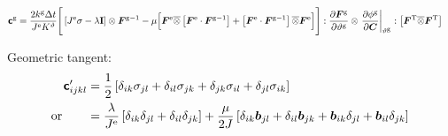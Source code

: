 \documentclass[10pt,letterpaper,oneside]{report}
\newcommand{\ten}[1]{\mbox{\boldmath $#1$}{}}
\newcommand{\tenf}[1]{\mbox{{\sffamily{\bfseries {#1}}}}}
\newcommand{\scas}[1]{\mbox{{\scriptsize{${\rm{#1}}$}}}{}}
\begin{document}
\begin{align}
\tenf{c}^{\scas{g}} ={}& \frac{2 k^{\scas{g}} \Delta t}{ J^{\scas{e}} K^\vartheta } \Bigg[ \left[ J^{\scas{e}} \sigma - \lambda \mathbf{I} \right] \otimes \ten{F}^{\scas{g}-1} - \mu \Big[ \ten{F}^{\scas{e}} \overline{\otimes} \left[ \ten{F}^{\scas{e}} \cdot \ten{F}^{\scas{g}-1} \right] + \left[ \ten{F}^{\scas{e}} \cdot \ten{F}^{\scas{g}-1} \right] \overline{\otimes} \ten{F}^{\scas{e}} \Big] \Bigg] : \frac{ \partial \ten{F}^{\scas{g}} }{ \partial \vartheta^{\scas{g}} } \otimes \left. \frac{ \partial \phi^{\scas{g}} }{ \partial \ten{C} } \right|_{\vartheta^{\scas{g}}} : \left[ \ten{F}^{\scas{T}} \overline{\otimes} \ten{F}^{\scas{T}} \right]
\notag 
\end{align}

Geometric tangent:
\begin{align}
\tenf{c}'_{ijkl} ={}& \frac{1}{2} \left[ \delta_{ik}\sigma_{jl} + \delta_{il}\sigma_{jk} + \delta_{jk}\sigma_{il} + \delta_{jl}\sigma_{ik} \right]  
\\ \mbox{or} \qquad
={}& \frac{\lambda}{J^{\scas{e}}} \left[ \delta_{ik} \delta_{jl} + \delta_{il} \delta_{jk} \right] + \frac{\mu}{2J} \left[ \delta_{ik} \ten{b}_{jl} + \delta_{il} \ten{b}_{jk} + \ten{b}_{ik} \delta_{jl} + \ten{b}_{il} \delta_{jk} \right]
\end{align}
\end{document}
